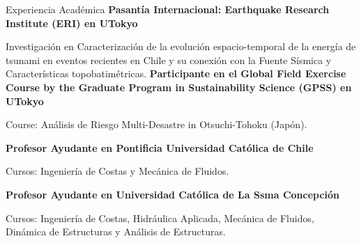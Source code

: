 \begin{rubric}{Experiencia Académica}
\entry*[2017 -- 2018]%
	\textbf{Pasantía Internacional: Earthquake Research Institute (ERI) en UTokyo}
	\par Investigación en Caracterización de la evolución espacio-temporal de la energía de tsunami en eventos recientes en Chile y su conexión con la Fuente Sísmica y Características topobatimétricas.
%
%
\entry*[2017]%
	\textbf{Participante en el Global Field Exercise Course by the Graduate Program in Sustainability Science (GPSS) en UTokyo}
	\par Course: Análisis de Riesgo Multi-Desastre in Otsuchi-Tohoku (Japón).

\entry*[2015 - 2019]%
	\textbf{Profesor Ayudante en Pontificia Universidad Cat\'olica de Chile}
	\par Cursos: Ingeniería de Costas y Mecánica de Fluidos.

\entry*[2011 - 2013]%
	\textbf{Profesor Ayudante en Universidad Cat\'olica de La Ssma Concepci\'on}
	\par Cursos: Ingeniería de Costas, Hidráulica Aplicada, Mecánica de Fluidos, Dinámica de Estructuras y Análisis de Estructuras.
\end{rubric}
